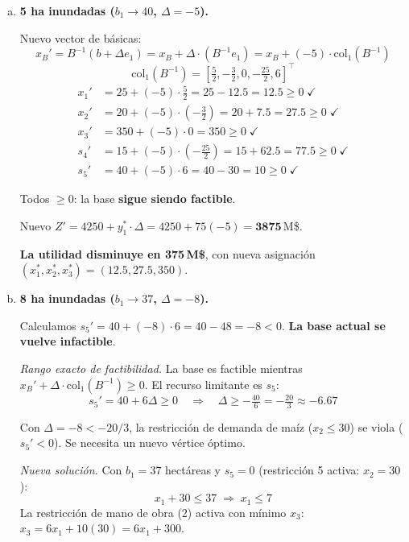 \documentclass{article}
\begin{document}
\begin{enumerate}[a)]
\textit{¿Hasta cuánto puede bajar el precio?} El precio sombra cambia de signo cuando el costo reducido de alguna no-básica se vuelve positivo:
$$\bar{c}_{s_1}' = 0 - y_1' = 0 - (c_1'-\tfrac{3}{2}\cdot200+0) = 0$$
Esto ocurre cuando $y_1'=0$, es decir $\tfrac{5}{2}c_1'=\tfrac{3}{2}(200)=300 \Rightarrow c_1'=120$\,M\$/ha, lo que equivale a precio/qq $= 120/5=24$\,M\$. Si el precio baja de M\$24, la base cambia.

\item \textbf{5 ha inundadas ($b_1\to40$, $\Delta=-5$).}

Nuevo vector de básicas:
$$x_B'=B^{-1}(b+\Delta e_1)=x_B+\Delta\cdot(B^{-1}e_1)=x_B+(-5)\cdot\text{col}_1(B^{-1})$$
$$\text{col}_1(B^{-1})=\left[\tfrac{5}{2},-\tfrac{3}{2},0,-\tfrac{25}{2},6\right]^\top$$
\begin{align*}
x_1' &= 25+(-5)\cdot\tfrac{5}{2}=25-12.5=12.5\geq0\;\checkmark\\
x_2' &= 20+(-5)\cdot(-\tfrac{3}{2})=20+7.5=27.5\geq0\;\checkmark\\
x_3' &= 350+(-5)\cdot0=350\geq0\;\checkmark\\
s_4' &= 15+(-5)\cdot(-\tfrac{25}{2})=15+62.5=77.5\geq0\;\checkmark\\
s_5' &= 40+(-5)\cdot6=40-30=10\geq0\;\checkmark
\end{align*}

Todos $\geq0$: la base \textbf{sigue siendo factible}.

Nuevo $Z'=4250+y_1^*\cdot\Delta=4250+75(-5)=\mathbf{3875}$\,M\$.

\textbf{La utilidad disminuye en 375\,M\$}, con nueva asignación $(x_1^*,x_2^*,x_3^*)=(12.5,27.5,350)$.

\item \textbf{8 ha inundadas ($b_1\to37$, $\Delta=-8$).}

Calculamos $s_5'=40+(-8)\cdot6=40-48=-8<0$. \textbf{La base actual se vuelve infactible}.

\textit{Rango exacto de factibilidad.} La base es factible mientras $x_B'+\Delta\cdot\text{col}_1(B^{-1})\geq0$. El recurso limitante es $s_5$:
$$s_5'=40+6\Delta\geq0 \quad\Rightarrow\quad \Delta\geq-\tfrac{40}{6}=-\tfrac{20}{3}\approx-6.67$$

Con $\Delta=-8<-20/3$, la restricción de demanda de maíz ($x_2\leq30$) se viola ($s_5'<0$). Se necesita un nuevo vértice óptimo.

\textit{Nueva solución.} Con $b_1=37$ hectáreas y $s_5=0$ (restricción 5 activa: $x_2=30$):
$$x_1+30\leq37 \;\Rightarrow\; x_1\leq7$$
La restricción de mano de obra (2) activa con mínimo $x_3$: $x_3=6x_1+10(30)=6x_1+300$.


\end{enumerate}
\end{document}
